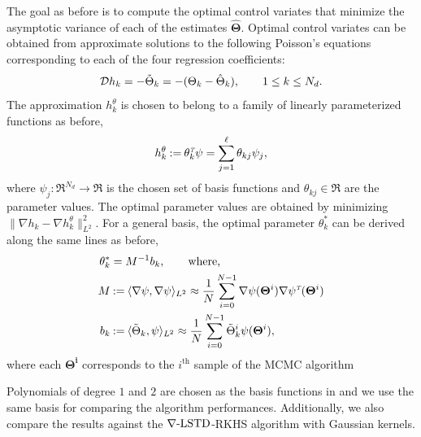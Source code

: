 The goal as before is to compute the optimal control variates that minimize the asymptotic variance of each of the estimates $\hat{\boldsymbol{\Theta}}$.
Optimal control variates can be obtained from approximate solutions to the following Poisson's equations corresponding to each of the four regression coefficients:
\begin{equation}
\generate h_k = -\tilde{\Theta}_k = - (\Theta_k - \hat{\Theta}_k), \qquad   1 \leq k \leq N_d.
\label{e:poisson_logit}
\end{equation}
The approximation $h^\theta_k$ is chosen to belong to a family of linearly parameterized functions as before,
\[
h^\theta_k \mathbin{:=} \theta_k^{\hbox{\tiny\it T}} \psi =  \sum_{j=1}^\ell \theta_{kj} \psi_j,
\]
where $\psi_j : \Re^{N_d} \to \Re$ is the chosen set of basis functions and $\theta_{kj} \in \Re$ are the parameter values.  The optimal parameter values are obtained by minimizing $ \| \nabla h_k - \nabla h^\theta_k \|^2_{L^2}$. For a general basis, the optimal parameter $\theta_k^*$  can be derived along the same lines as before,
\begin{equation}
\begin{aligned}
\theta_k^*  &= M^{-1} b_k, \qquad \text{where,}\\
M & \eqdef \langle \nabla \psi, \nabla \psi \rangle_{L^2} \approx \frac{1}{N} \sum_{i = 0}^{N-1}\nabla \psi(\boldsymbol{\Theta}^i) \nabla \psi^\transpose(\boldsymbol{\Theta}^i)\\
b_k & \eqdef \langle \tilde{\Theta}_k, \psi \rangle_{L^2} \approx \frac{1}{N} \sum_{i=0}^{N-1}\tilde{\Theta}_k^i \psi(\boldsymbol{\Theta}^i), \\
\label{e:theta_k}
\end{aligned}
\end{equation}
where each $\boldsymbol{\Theta^i}$ corresponds to the $i^{\text{th}}$ sample of the MCMC algorithm

Polynomials of degree $1$ and $2$ are chosen as the basis functions in \cite{papmirgir14} and we use the same basis for comparing the algorithm performances. Additionally, we also compare the results against the $\nabla\text{-LSTD}$-RKHS algorithm with Gaussian kernels. 


